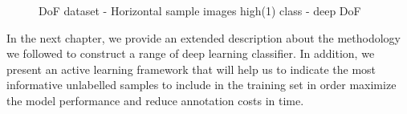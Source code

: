 \begin{figure}[ht!]
    \centering  
    \caption{DoF dataset - Horizontal sample images high(1) class - deep DoF}
    \label{c4:dof_horizontal_high_class_samples}
\end{figure}

In the next chapter, we provide an extended description about the methodology we followed to construct a range of deep learning classifier. In addition, we present an active learning framework that will help us to indicate the most informative unlabelled samples to include in the training set in order maximize the model performance and reduce annotation costs in time.
